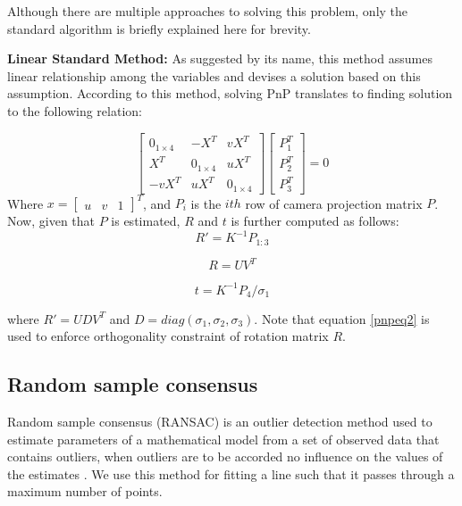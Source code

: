 \documentclass[11pt, a4paper, openany]{article}
\begin{document}
Although there are multiple approaches to solving this problem, only the standard algorithm is briefly explained here for brevity.
\begin{description}
\item \textbf{Linear Standard Method:} As suggested by its name, this method assumes linear relationship among the variables and devises a solution based on this assumption. According to this method, solving PnP translates to finding solution to the following relation: \newline

\begin{equation}\label{pnpsolveeq}
\begin{bmatrix}
0_{1\times4} & -X^{T} & vX^{T}\\
X^{T} & 0_{1\times4} & uX^{T}\\
-vX^{T} & uX^{T} & 0_{1\times4}
\end{bmatrix}
\begin{bmatrix}
P_{1}^{T}\\
P_{2}^{T}\\
P_{3}^{T}
\end{bmatrix}
= 0
\end{equation}
Where $x = \begin{bmatrix}
u&
v&
1
\end{bmatrix}^T$, and $P_{i}$ is the $ith$ row of camera projection matrix $P$. Now, given that $P$ is estimated, $R$ and $t$ is further computed as follows:
\begin{equation}\label{pnpeq}
R' = K^{-1}P_{1:3}
\end{equation}

\begin{equation}\label{pnpeq2}
R = UV^{T}
\end{equation}

\begin{equation}\label{pnpeq3}
t = K^{-1}P_{4} / \sigma_{1}
\end{equation}

where $R'=UDV^{T}$ and $D = diag(\sigma_{1},\sigma_{2},\sigma_{3})$. Note that equation \eqref{pnpeq2} is used to enforce orthogonality constraint of rotation matrix $R$.
\end{description}

\subsection{Random sample consensus} Random sample consensus (RANSAC) is an outlier detection method used to estimate parameters of a mathematical model from a set of observed data that contains outliers, when outliers are to be accorded no influence on the values of the estimates \cite{ransac}. We use this method for fitting a line such that it passes through a maximum number of points.
\end{document}
